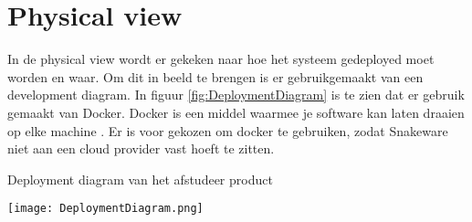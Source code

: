 \section{Physical view}
In de physical view wordt er gekeken naar hoe het systeem gedeployed moet worden en waar.
Om dit in beeld te brengen is er gebruikgemaakt van een development diagram.
In figuur \ref{fig:DeploymentDiagram} is te zien dat er gebruik gemaakt van Docker.
Docker is een middel waarmee je software kan laten draaien op elke machine \Parencite{Docker}.
Er is voor gekozen om docker te gebruiken, zodat Snakeware niet aan een cloud provider vast hoeft te zitten.

\whitespace
\begin{graphic}
    \captionsetup{type=figure}
    \caption{Deployment diagram van het afstudeer product}
    \texttt{[image: DeploymentDiagram.png]}
    \label{fig:DeploymentDiagram}
\end{graphic}
